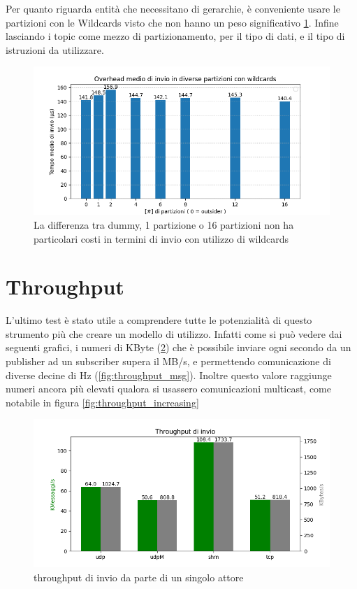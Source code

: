 Per quanto riguarda entità che necessitano di gerarchie, è conveniente usare le partizioni con le Wildcards visto che non hanno un peso significativo \ref{fig:test2wildcards}. Infine lasciando i topic come mezzo di partizionamento, per il tipo di dati, e il tipo di istruzioni da utilizzare.

\begin{figure}[H]
    \centering
    \includegraphics[width=\textwidth]{./results/test2_wildcards.png}
    \caption{La differenza tra dummy, 1 partizione o 16 partizioni non ha particolari costi in termini di invio con utilizzo di wildcards}
        \label{fig:test2wildcards}
\end{figure}



\section{Throughput}
L'ultimo test è stato utile a comprendere tutte le potenzialità di questo strumento più che creare un modello di utilizzo. Infatti come si può vedere dai seguenti grafici, i numeri di KByte (\ref{fig:throughput_Byte}) che è possibile inviare ogni secondo da un publisher ad un subscriber supera il MB/s, e permettendo comunicazione di diverse decine di Hz (\ref{fig:throughput_msg}). Inoltre questo valore raggiunge numeri ancora più elevati qualora si usassero comunicazioni multicast, come notabile in figura \ref{fig:throughput_increasing}
\begin{figure}[H]
    \includegraphics[width=\textwidth]{./results/test3_throughput_combined.png} 
        \caption{throughput di invio da parte di un singolo attore} %

        \label{fig:throughput_Byte}
\end{figure}

